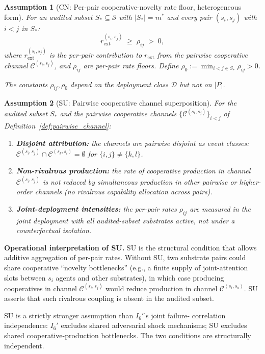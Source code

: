 \documentclass{article}
\newtheorem{assumption}{Assumption}
\newcommand{\rext}{r_{\mathrm{ext}}}
\newcommand{\Saudit}{S_*}
\begin{document}
\begin{assumption}[CN: Per-pair cooperative-novelty rate floor, heterogeneous form]
\label{ass:CN}
For an audited subset $\Saudit \subseteq \mathcal{S}$ with $|\Saudit|
= m^*$ and every pair $(s_i, s_j)$ with $i < j$ in $\Saudit$:
\[
  \rext^{(s_i, s_j)} \;\geq\; \rho_{ij} \;>\; 0,
\]
where $\rext^{(s_i, s_j)}$ is the per-pair contribution to $\rext$
from the pairwise cooperative channel $\mathcal{C}^{(s_i, s_j)}$,
and $\rho_{ij}$ are per-pair rate floors.  Define $\rho_0 :=
\min_{i<j \in \Saudit} \rho_{ij} > 0$.

The constants $\rho_{ij}, \rho_0$ depend on the deployment class
$\mathcal{D}$ but not on $|P|$.
\end{assumption}

\begin{assumption}[SU: Pairwise cooperative channel superposition]
\label{ass:SU}
For the audited subset $\Saudit$ and the pairwise cooperative
channels $\{\mathcal{C}^{(s_i, s_j)}\}_{i<j}$ of
Definition~\ref{def:pairwise_channel}:
\begin{enumerate}
\item \textbf{Disjoint attribution:} the channels are pairwise
  disjoint as event classes: $\mathcal{C}^{(s_i, s_j)} \cap
  \mathcal{C}^{(s_k, s_l)} = \emptyset$ for $\{i,j\} \neq \{k,l\}$.
\item \textbf{Non-rivalrous production:} the rate of cooperative
  production in channel $\mathcal{C}^{(s_i, s_j)}$ is not reduced
  by simultaneous production in other pairwise or higher-order
  channels (no rivalrous capability allocation across pairs).
\item \textbf{Joint-deployment intensities:} the per-pair rates
  $\rho_{ij}$ are measured in the joint deployment with all
  audited-subset substrates active, not under a counterfactual
  isolation.
\end{enumerate}
\end{assumption}

\textbf{Operational interpretation of SU.}  SU is the structural
condition that allows additive aggregation of per-pair rates.
Without SU, two substrate pairs could share cooperative
``novelty bottlenecks'' (e.g., a finite supply of joint-attention
slots between $s_i$ agents and other substrates), in which case
producing cooperatives in channel $\mathcal{C}^{(s_i, s_j)}$ would
reduce production in channel $\mathcal{C}^{(s_i, s_k)}$.  SU
asserts that such rivalrous coupling is absent in the audited
subset.

SU is a strictly stronger assumption than $I_6'$'s joint failure-
correlation independence: $I_6'$ excludes shared adversarial shock
mechanisms; SU excludes shared cooperative-production bottlenecks.
The two conditions are structurally independent.
\end{document}
